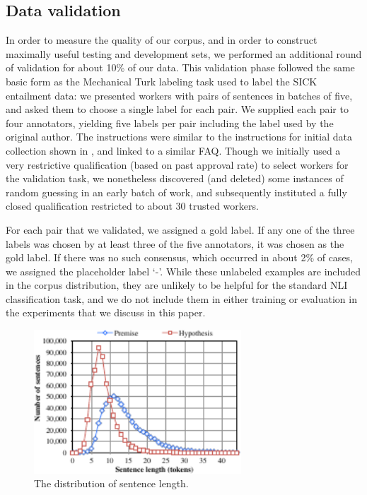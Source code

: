 \subsection{Data validation}

In order to measure the quality of our corpus, and in order to construct maximally useful testing and development sets, we performed an additional round of validation for about 10\% of our data.
This validation phase followed the same basic form as the Mechanical Turk labeling task used to label the SICK entailment data: we presented workers with pairs of sentences in batches of five, and asked them to choose a single label for each pair. We supplied each pair to four annotators, yielding five labels per pair including the label used by the original author. The instructions were similar to the instructions for initial data collection shown in , and linked to a similar FAQ. Though we initially used a very restrictive qualification (based on past approval rate) to select workers for the validation task, we nonetheless discovered (and deleted) some instances of random guessing in an early batch of work, and subsequently instituted a fully closed qualification restricted to about 30 trusted workers.

For each pair that we validated, we assigned a gold label. If any one of
the three labels was chosen by at least three of the five annotators, it was 
chosen as the gold label. If there was no such consensus, which
occurred in about 2\% of cases, we assigned the placeholder label `-'. 
While these unlabeled examples are included in the corpus distribution, they are
unlikely to be helpful for the standard NLI classification task, and
we do not include them in either training or evaluation in the experiments that we 
discuss in this paper.

 
\begin{figure}
\center
\includegraphics[width=3.05in]{length_dist}
\caption{\label{length-dist}The distribution of sentence length.} 
\end{figure}
 

